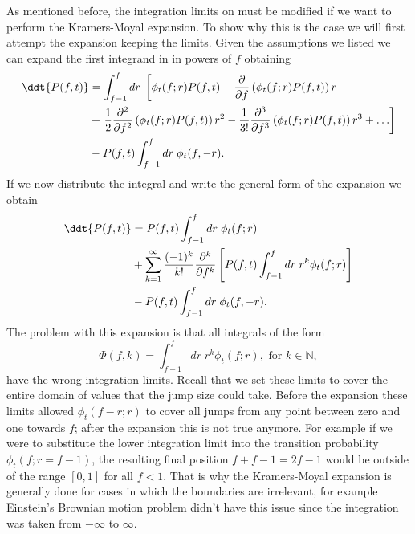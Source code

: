 As mentioned before, the integration limits on  must be
modified if we want to perform the Kramers-Moyal expansion. To show why this is
the case we will first attempt the expansion keeping the limits. Given the
assumptions we listed we can expand the first integrand in
 in powers of $f$ obtaining
\begin{equation}
  \begin{split}
    \ddt{P(f, t)} &= \int^f_{f - 1} dr \;
    \left[
    \phi_t(f; r) P(f, t) -
    {\partial \over \partial f} \left( \phi_t(f; r) P(f, t) \right) r \right. \\
    &+ \left.
    {1 \over 2} {\partial^2 \over \partial f^2}
    \left( \phi_t(f; r) P(f, t) \right) r^2 -
    {1 \over 3!} {\partial^3 \over \partial f^3}
    \left( \phi_t(f; r) P(f, t) \right) r^3 + \ldots
    \right] \\
    &-
    P(f, t) \int_{f - 1}^f dr \; \phi_t(f, -r).
  \end{split}
\end{equation}
If we now distribute the integral and write the general form of the expansion
we obtain
\begin{equation}
  \begin{split}
    \ddt{P(f, t)} &= P(f, t)\int^f_{f - 1} dr \; \phi_t(f; r) \\
    &+
    \sum_{k=1}^\infty {(-1)^k \over k!} {\partial^k \over \partial f^k}
    \left[
    P(f, t) \int_{f-1}^f dr \; r^k \phi_t(f; r)
    \right] \\
    &-
    P(f, t) \int_{f - 1}^f dr \; \phi_t(f, -r).
  \end{split}
\end{equation}
The problem with this expansion is that all integrals of the form
\begin{equation}
  \Phi(f, k) = \int_{f-1}^f dr \; r^k \phi_t(f; r),
  \text{ for } k \in \mathbb{N},
\end{equation}
have the wrong integration limits. Recall that we set these limits to cover the
entire domain of values that the jump size could take. Before the expansion
these limits allowed $\phi_t(f - r; r)$ to cover all jumps from any point
between zero and one towards $f$; after the expansion this is not true anymore.
For example if we were to substitute the lower integration limit into the
transition probability $\phi_t(f; r = f-1)$, the resulting final position $f +
f -1 = 2f -1$ would be outside of the range $[0, 1]$ for all $f < 1$. That is
why the Kramers-Moyal expansion is generally done for cases in which the
boundaries are irrelevant, for example Einstein's Brownian motion problem
didn't have this issue since the integration was taken from $-\infty$ to
$\infty$.

